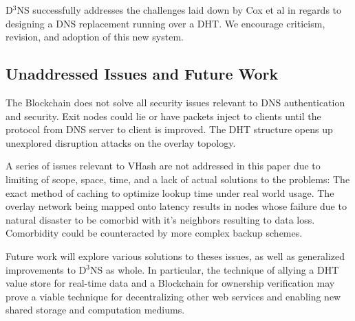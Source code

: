 \documentclass[11pt]{IEEEtran} %
\begin{document}
D$^3$NS successfully addresses the challenges laid down by Cox et al \cite{cox}  in regards to designing a DNS replacement running over a DHT.   We encourage criticism, revision, and adoption of this new system.

\subsection{Unaddressed Issues and Future Work}
The Blockchain does not solve all security issues relevant to DNS authentication and security. Exit nodes could lie or have packets inject to clients until the protocol from DNS server to client is improved. The DHT structure opens up unexplored disruption attacks on the overlay topology.

A series of issues relevant to VHash are not addressed in this paper due to limiting of scope, space, time, and a lack of actual solutions to the problems: The exact method of caching to optimize lookup time under real world usage. The overlay network being mapped onto latency results in nodes whose failure due to natural disaster to be comorbid with it's neighbors resulting to data loss. Comorbidity could be counteracted by more complex backup schemes.

Future work will explore various solutions to theses issues, as well as generalized improvements to D$^3$NS as whole.  In particular, the technique of allying a DHT value store for real-time data and a Blockchain for ownership verification may prove a viable technique for decentralizing other web services and enabling new shared storage and computation mediums.




\end{document}
